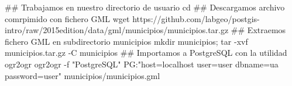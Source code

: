 \lstset{caption=Importación de estancias,label=bash:importarMunicipios}
\begin{bash}
## Trabajamos en nuestro directorio de usuario
cd
## Descargamos archivo comrpimido con fichero GML
wget https://github.com/labgeo/postgis-intro/raw/2015edition/data/gml/municipios/municipios.tar.gz
## Extraemos fichero GML en subdirectorio municipios
mkdir municipios; tar -xvf municipios.tar.gz -C municipios
## Importamos a PostgreSQL con la utilidad ogr2ogr
ogr2ogr -f "PostgreSQL" PG:"host=localhost user=user dbname=ua password=user" municipios/municipios.gml
\end{bash}
